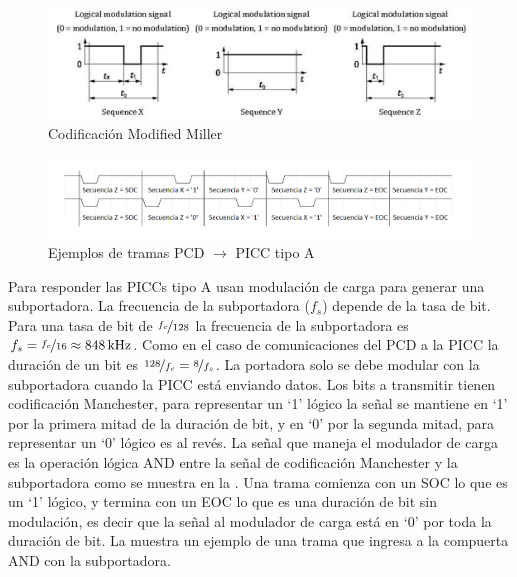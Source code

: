 \documentclass[a4paper, twoside, 11pt]{report}
\begin{document}
\begin{figure}[htb]
  \centering
  \includegraphics[scale=0.5]{./img/sequences}
  \caption{Codificación Modified Miller~\cite{iso14443-2}}
  \label{fig:sequences}
\end{figure}

\begin{figure}[htb]
  \centering
  \includegraphics[scale=0.45]{./img/rx_frame_examples}
  \caption{Ejemplos de tramas PCD $\rightarrow$ PICC tipo A}
  \label{fig:rx_frame_examples}
\end{figure}

\FloatBarrier

Para responder las PICCs tipo A usan modulación de carga para generar una subportadora.  La frecuencia de la subportadora ($f_s$) depende de la tasa de bit. Para una tasa de bit de $\nicefrac{f_c}{128}$ la frecuencia de la subportadora es $f_s = \nicefrac{f_c}{16} \approx \SI{848}{\kilo\hertz}$. Como en el caso de comunicaciones del PCD a la PICC la duración de un bit es $\nicefrac{128}{f_c} = \nicefrac{8}{f_s}$. La portadora solo se debe modular con la subportadora cuando la PICC está enviando datos. Los bits a transmitir tienen codificación Manchester, para representar un ‘1’ lógico la señal se mantiene en ‘1’ por la primera mitad de la duración de bit, y en ‘0’ por la segunda mitad, para representar un ‘0’ lógico es al revés. La señal que maneja el modulador de carga es la operación lógica AND entre la señal de codificación Manchester y la subportadora como se muestra en la . Una trama comienza con un SOC lo que es un ‘1’ lógico, y termina con un EOC lo que es una duración de bit sin modulación, es decir que la señal al modulador de carga está en ‘0’ por toda la duración de bit. La  muestra un ejemplo de una trama que ingresa a la compuerta AND con la subportadora.
\end{document}
